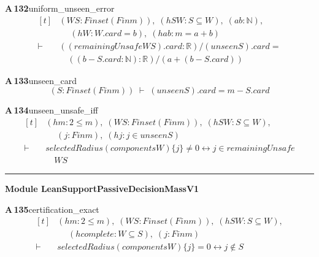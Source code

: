 \documentclass[conference]{IEEEtran}
\theoremstyle{definition}
\newcommand{\lean}[1]{\textsf{\footnotesize #1}}
\begin{document}
\noindent\textbf{A\,132}\quad\lean{uniform\_unseen\_error}
{\footnotesize\[ \begin{aligned}[t]
&(\mathit{W} \mathit{S} : \mathit{Finset} (\mathit{Fin} \mathit{m})),\; (\mathit{hSW} : \mathit{S} \subseteq \mathit{W}),\; (\mathit{a} \mathit{b} : \mathbb{N} ),\\
&\quad \; (\mathit{hW} : \mathit{W}.\mathit{card}=\mathit{b}),\; (\mathit{hab} : \mathit{m}=\mathit{a}+\mathit{b})\\
\vdash\;&((\mathit{remainingUnsafe} \mathit{W} \mathit{S}).\mathit{card} : \mathbb{R} )/(\mathit{unseen} \mathit{S}).\mathit{card} =\\
&\quad ((\mathit{b}-\mathit{S}.\mathit{card} : \mathbb{N} ):\mathbb{R} )/(\mathit{a}+(\mathit{b}-\mathit{S}.\mathit{card}))
\end{aligned} \]}

\noindent\textbf{A\,133}\quad\lean{unseen\_card}
{\footnotesize\[ (\mathit{S} : \mathit{Finset} (\mathit{Fin} \mathit{m})) \;\vdash\; (\mathit{unseen} \mathit{S}).\mathit{card}=\mathit{m}-\mathit{S}.\mathit{card} \]}

\noindent\textbf{A\,134}\quad\lean{unseen\_unsafe\_iff}
{\footnotesize\[ \begin{aligned}[t]
&(\mathit{hm} : 2 \leq \mathit{m}),\; (\mathit{W} \mathit{S} : \mathit{Finset} (\mathit{Fin} \mathit{m})),\; (\mathit{hSW} : \mathit{S} \subseteq \mathit{W}),\\
&\quad \; (\mathit{j} : \mathit{Fin} \mathit{m}),\; (\mathit{hj} : \mathit{j} \in \mathit{unseen} \mathit{S})\\
\vdash\;&\mathit{selectedRadius} (\mathit{components} \mathit{W}) \{ \mathit{j}\} \neq 0 \leftrightarrow \mathit{j} \in \mathit{remainingUnsafe}\\
&\quad \mathit{W} \mathit{S}
\end{aligned} \]}

\vspace{4pt}\noindent\rule{\columnwidth}{0.4pt}\par\vspace{2pt}
\noindent\textbf{Module \lean{LeanSupportPassiveDecisionMassV1}}\par\vspace{3pt}

\noindent\textbf{A\,135}\quad\lean{certification\_exact}
{\footnotesize\[ \begin{aligned}[t]
&(\mathit{hm} : 2 \leq \mathit{m}),\; (\mathit{W} \mathit{S} : \mathit{Finset} (\mathit{Fin} \mathit{m})),\; (\mathit{hSW} : \mathit{S} \subseteq \mathit{W}),\\
&\quad \; (\mathit{hcomplete} : \mathit{W} \subseteq \mathit{S}),\; (\mathit{j} : \mathit{Fin} \mathit{m})\\
\vdash\;&\mathit{selectedRadius} (\mathit{components} \mathit{W}) \{ \mathit{j}\} = 0 \leftrightarrow \mathit{j} \notin \mathit{S}
\end{aligned} \]}
\end{document}

